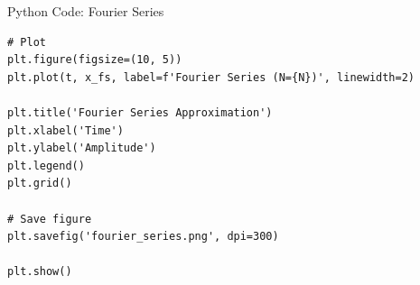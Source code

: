\documentclass{beamer}
\begin{document}
\begin{frame}[fragile]{Python Code: Fourier Series}


\begin{lstlisting}
# Plot 
plt.figure(figsize=(10, 5))
plt.plot(t, x_fs, label=f'Fourier Series (N={N})', linewidth=2)

plt.title('Fourier Series Approximation')
plt.xlabel('Time')
plt.ylabel('Amplitude')
plt.legend()
plt.grid()

# Save figure
plt.savefig('fourier_series.png', dpi=300)

plt.show()
\end{lstlisting} 
\end{frame}
\end{document}

